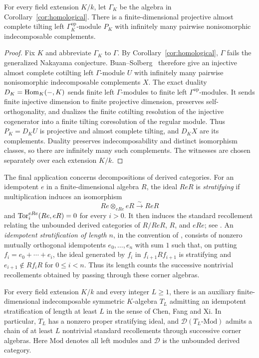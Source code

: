 \begin{corollary}\label{cor:tilting-complements}
For every field extension $K/k$, let $\Gamma_K$ be the algebra in
Corollary~\ref{cor:homological}. There is a finite-dimensional projective
almost complete tilting left $\Gamma_K^{\mathrm{op}}$-module $P_K$ with
infinitely many pairwise nonisomorphic indecomposable complements.
\end{corollary}

\begin{proof}
Fix $K$ and abbreviate $\Gamma_K$ to $\Gamma$. By
Corollary~\ref{cor:homological}, $\Gamma$ fails the generalized Nakayama
conjecture. Buan--Solberg~\cite[Theorems~3.1 and~3.4]{BuanSolberg1998}
therefore give an injective almost complete cotilting left $\Gamma$-module
$U$ with infinitely many pairwise nonisomorphic indecomposable complements
$X$. The exact duality $D_K=\operatorname{Hom}_K(-,K)$ sends finite left
$\Gamma$-modules to finite left $\Gamma^{\mathrm{op}}$-modules.
It sends finite injective dimension to finite projective dimension,
preserves self-orthogonality, and dualizes the finite cotilting resolution
of the injective cogenerator into a finite tilting coresolution of the
regular module. Thus $P_K=D_KU$ is projective and almost complete tilting,
and $D_KX$ are its complements. Duality preserves indecomposability and
distinct isomorphism classes, so there are infinitely many such
complements. The witnesses are chosen separately over each extension
$K/k$.
\end{proof}

The final application concerns decompositions of derived categories.
For an idempotent $e$ in a finite-dimensional algebra $R$, the ideal
$ReR$ is \emph{stratifying} if multiplication induces an isomorphism
\[
 Re\otimes_{eRe}eR\xrightarrow{\sim}ReR
\]
and $\operatorname{Tor}_i^{eRe}(Re,eR)=0$ for every $i>0$.
It then induces the standard recollement relating the unbounded
derived categories of $R/ReR$, $R$, and $eRe$; see
\cite[Introduction]{ChenFangXi2024}.
An \emph{idempotent stratification of length $n$}, in the convention of
\cite[Definition~4.7]{ChenFangXi2024}, consists of nonzero mutually
orthogonal idempotents $e_0,\ldots,e_n$ with sum $1$ such that, on putting
$f_i=e_0+\cdots+e_i$, the ideal generated by $f_i$ in
$f_{i+1}Rf_{i+1}$ is stratifying and $e_{i+1}\notin Rf_iR$ for
$0\leq i<n$. Thus its length counts the successive nontrivial
recollements obtained by passing through these corner algebras.

\begin{corollary}\label{cor:stratifying}
For every field extension $K/k$ and every integer $L\geq1$, there is an
auxiliary finite-dimensional indecomposable symmetric $K$-algebra $T_L$
admitting an idempotent stratification of length at least $L$ in the sense
of Chen, Fang and Xi. In particular, $T_L$ has a nonzero proper
stratifying ideal, and $\mathcal D(T_L\text{-}\mathrm{Mod})$ admits a
chain of at least $L$ nontrivial standard recollements through successive
corner algebras. Here $\mathrm{Mod}$ denotes all left modules and
$\mathcal D$ is the unbounded derived category.
\end{corollary}

